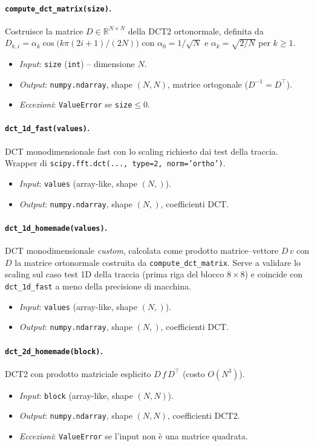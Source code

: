 \documentclass[11pt,a4paper]{article}
\begin{document}
\paragraph{\texttt{compute\_dct\_matrix(size)}.}
Costruisce la matrice $D\in\mathbb{R}^{N\times N}$ della DCT2 ortonormale,
definita da $D_{k,i}=\alpha_k\cos\!\bigl(k\pi(2i+1)/(2N)\bigr)$ con
$\alpha_0=1/\sqrt{N}$ e $\alpha_k=\sqrt{2/N}$ per $k\ge 1$.
\begin{itemize}
  \item \emph{Input}: \texttt{size} (\texttt{int}) -- dimensione $N$.
  \item \emph{Output}: \texttt{numpy.ndarray}, shape $(N,N)$, matrice ortogonale
        ($D^{-1}=D^\top$).
  \item \emph{Eccezioni}: \texttt{ValueError} se \texttt{size}$\le 0$.
\end{itemize}

\paragraph{\texttt{dct\_1d\_fast(values)}.}
DCT monodimensionale fast con lo scaling richiesto dai test della traccia.
Wrapper di \texttt{scipy.fft.dct(..., type=2, norm='ortho')}.
\begin{itemize}
  \item \emph{Input}: \texttt{values} (array-like, shape $(N,)$).
  \item \emph{Output}: \texttt{numpy.ndarray}, shape $(N,)$, coefficienti DCT.
\end{itemize}

\paragraph{\texttt{dct\_1d\_homemade(values)}.}
DCT monodimensionale \emph{custom}, calcolata come prodotto matrice--vettore
$D\,v$ con $D$ la matrice ortonormale costruita da \texttt{compute\_dct\_matrix}.
Serve a validare lo scaling sul caso test 1D della traccia (prima riga del
blocco $8\times8$) e coincide con \texttt{dct\_1d\_fast} a meno della precisione
di macchina.
\begin{itemize}
  \item \emph{Input}: \texttt{values} (array-like, shape $(N,)$).
  \item \emph{Output}: \texttt{numpy.ndarray}, shape $(N,)$, coefficienti DCT.
\end{itemize}

\paragraph{\texttt{dct\_2d\_homemade(block)}.}
DCT2 con prodotto matriciale esplicito $D\,f\,D^\top$ (costo $O(N^3)$).
\begin{itemize}
  \item \emph{Input}: \texttt{block} (array-like, shape $(N,N)$).
  \item \emph{Output}: \texttt{numpy.ndarray}, shape $(N,N)$, coefficienti DCT2.
  \item \emph{Eccezioni}: \texttt{ValueError} se l'input non è una matrice
        quadrata.
\end{itemize}
\end{document}
